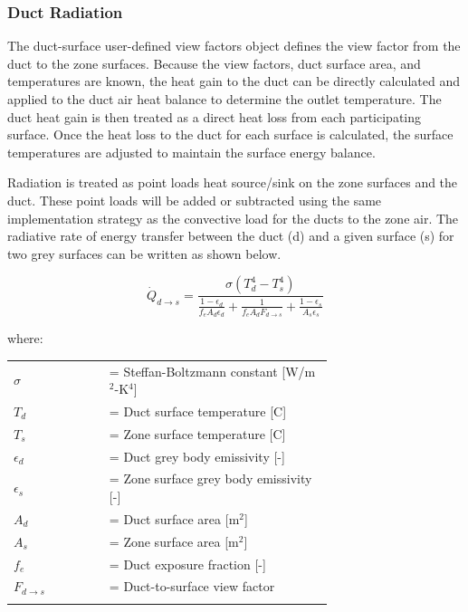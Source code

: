 \subsubsection{Duct Radiation}

The duct-surface user-defined view factors object defines the view factor from the duct to the zone surfaces. Because the view factors, duct surface area, and temperatures are known, the heat gain to the duct can be directly calculated and applied to the duct air heat balance to determine the outlet temperature. The duct heat gain is then treated as a direct heat loss from each participating surface. Once the heat loss to the duct for each surface is calculated, the surface temperatures are adjusted to maintain the surface energy balance.

Radiation is treated as point loads heat source/sink on the zone surfaces and the duct.  These point loads will be added or subtracted using the same implementation strategy as the convective load for the ducts to the zone air.  The radiative rate of energy transfer between the duct (d) and a given surface (s) for two grey surfaces can be written as shown below.


\begin{equation}
\dot{Q}_{d\rightarrow s} = \frac{\sigma (T^4_d - T^4_s)}{\frac{1 - \epsilon_d}{f_e A_d \epsilon_d} + \frac{1}{f_e A_d F_{d\rightarrow s}}+\frac{1 - \epsilon_s}{A_s \epsilon_s}}
\end{equation}

where:

\begin{tabular}{lp{0.7\linewidth}}
\\
$\sigma$ &= Steffan-Boltzmann constant [W/m\(^{2}\)-K\(^{4}\)] \\
$T_d$ &= Duct surface temperature [C] \\
$T_s$ &= Zone surface temperature [C] \\
$\epsilon_d$ &= Duct grey body emissivity [-] \\
$\epsilon_s$ &= Zone surface grey body emissivity [-] \\
$A_d$ &= Duct surface area [m\(^{2}\)] \\
$A_s$ &= Zone surface area [m\(^{2}\)] \\
$f_e$ &= Duct exposure fraction [-] \\
$F_{d\rightarrow s}$ &= Duct-to-surface view factor \\
\\
\end{tabular}

